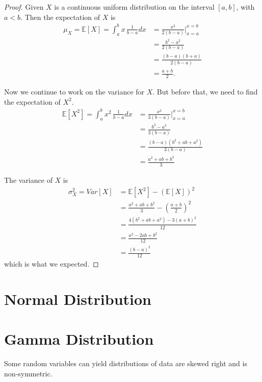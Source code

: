 \begin{proof}
    Given $X$ is a continuous uniform distribution on the interval $[a,b]$, with $a < b$. Then the 
    expectation of $X$ is 
    \begin{align*}
        \mu_X = \mathbb{E}[X] = \int_{a}^{b} x\, \frac{1}{b - a} dx
        &= \frac{x^2}{2(b - a)} \bigg \vert^{x = b}_{x = a}\\[0.5em]
        &= \frac{b^2 - a^2}{2(b-a)}\\[0.5em]
        &= \frac{(b-a)(b+a)}{2(b-a)}\\[0.5em]
        &= \frac{a+b}{2}.
    \end{align*}

    Now we continue to work on the variance for $X$. But before that, we need to find the expectation of $X^2$.
    \begin{align*}
        \mathbb{E}[X^2] = \int_{a}^{b} x^2\, \frac{1}{b - a} dx
        &= \frac{x^3}{3(b - a)} \bigg \vert^{x = b}_{x = a}\\[0.5em]
        &= \frac{b^3 - a^3}{3(b-a)} \\[0.5em]
        &= \frac{(b-a)(b^2 + ab + a^2)}{3(b-a)}\\[0.5em]
        &= \frac{a^2 + ab + b^2}{3}
    \end{align*}

    The variance of $X$ is 
    \begin{align*}
        \sigma^2_X = Var[X] &= \mathbb{E}[X^2] - (\mathbb{E}[X])^2\\[0.5em]
        &= \frac{a^2 + ab + b^2}{3} - \left( \frac{a+b}{2} \right)^2\\[0.5em]
        &= \frac{4(b^2 + ab + a^2) - 3(a+b)^2}{12}\\[0.5em]
        &= \frac{a^2 - 2ab + b^2}{12}\\[0.5em]
        &= \frac{(b-a)^2}{12}
    \end{align*}
    which is what we expected.
\end{proof}

\section{Normal Distribution}



\section{Gamma Distribution}

Some random variables can yield distributions of data are skewed right and is non-symmetric.

